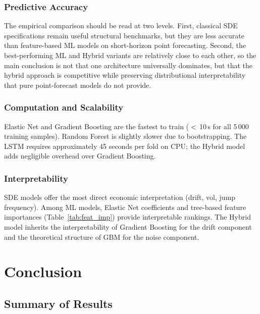\documentclass[12pt, a4paper, oneside]{report}
\theoremstyle{plain}
\theoremstyle{definition}
\theoremstyle{remark}
\begin{document}
\subsection{Predictive Accuracy}

The empirical comparison should be read at two levels.  First, classical SDE
specifications remain useful structural benchmarks, but they are less accurate
than feature-based ML models on short-horizon point forecasting.  Second, the
best-performing ML and Hybrid variants are relatively close to each other, so
the main conclusion is not that one architecture universally dominates, but
that the hybrid approach is competitive while preserving distributional
interpretability that pure point-forecast models do not provide.

\subsection{Computation and Scalability}

Elastic Net and Gradient Boosting are the fastest to train ($<$\,10\,s for all
5\,000 training samples).  Random Forest is slightly slower due to
bootstrapping.  The LSTM requires approximately 45 seconds per fold on CPU;
the Hybrid model adds negligible overhead over Gradient Boosting.

\subsection{Interpretability}

SDE models offer the most direct economic interpretation (drift, vol, jump
frequency).  Among ML models, Elastic Net coefficients and tree-based feature
importances (Table~\ref{tab:feat_imp}) provide interpretable rankings.  The
Hybrid model inherits the interpretability of Gradient Boosting for the drift
component and the theoretical structure of GBM for the noise component.

\clearpage
\chapter*{Conclusion}

\section*{Summary of Results}
\end{document}
